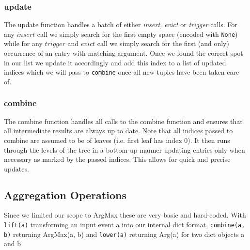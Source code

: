 \subsubsection{update}
The update function handles a batch of either \textit{insert, evict} or \textit{trigger}
calls. For any $insert$ call we simply search for the first empty space
(encoded with \texttt{None})
while for any $trigger$ and $evict$ call we simply search for the first (and only) occurrence of
an entry with matching argument. Once we found the correct spot in our list we
update it accordingly and add this index to a list of updated indices which we will
pass to \texttt{combine} once all new tuples have been taken care of.


\subsubsection{combine}
The combine function handles all calls to the combine function and ensures that all
intermediate results are always up to date. Note that all indices passed to combine
are assumed to be of leaves (i.e. first leaf has index 0). It then runs through the
levels of the tree in a bottom-up manner updating entries only when necessary as
marked by the passed indices. This allows for quick and precise updates.

\subsection{Aggregation Operations}
Since we limited our scope to ArgMax these are very basic and hard-coded. With \texttt{lift(a)}
transforming an input event a into our internal dict format, \texttt{combine(a, b)} returning ArgMax(a, b)
and \texttt{lower(a)} returning Arg(a) for two dict objects a and b

